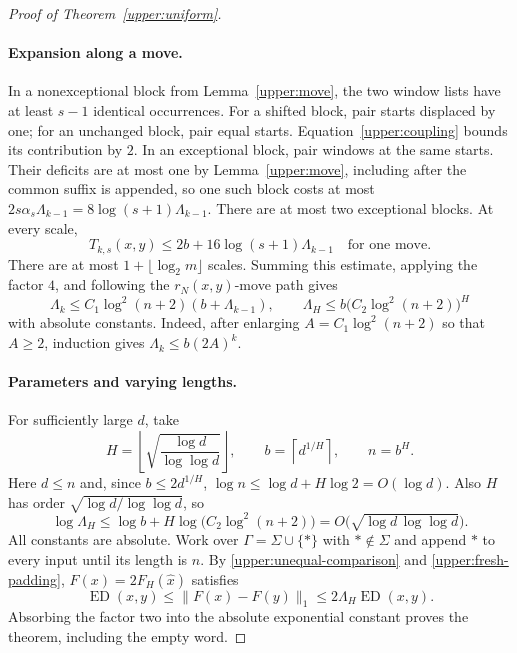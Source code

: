 \begin{proof}[Proof of Theorem~\ref{upper:uniform}]
\paragraph{Expansion along a move.}
In a nonexceptional block from Lemma~\ref{upper:move}, the two window
lists have at least $s-1$ identical occurrences.  For a shifted block,
pair starts displaced by one; for an unchanged block, pair equal starts.
Equation~\eqref{upper:coupling} bounds its contribution by $2$.
In an exceptional block, pair windows at the same starts.  Their
deficits are at most one by Lemma~\ref{upper:move}, including after the
common suffix is appended, so one such block costs at most
$2s\alpha_s\Lambda_{k-1}=8\log(s+1)\Lambda_{k-1}$.
There are at most two exceptional blocks.  At every scale,
\begin{equation}\label{upper:power-move}
 T_{k,s}(x,y)\le2b+16\log(s+1)\Lambda_{k-1}
 \quad\text{for one move.}
\end{equation}
There are at most $1+\lfloor\log_2m\rfloor$ scales.  Summing this estimate,
applying the factor $4$, and following the $r_N(x,y)$-move path gives
\begin{equation}\label{upper:power-recurrence}
 \Lambda_k\le C_1\log^2(n+2)(b+\Lambda_{k-1}),\qquad
 \Lambda_H\le b\bigl(C_2\log^2(n+2)\bigr)^H
\end{equation}
with absolute constants.  Indeed, after enlarging
$A=C_1\log^2(n+2)$ so that $A\ge2$, induction gives
$\Lambda_k\le b(2A)^k$.

\paragraph{Parameters and varying lengths.}
For sufficiently large $d$, take
\begin{equation}\label{upper:parameters}
 H=\left\lfloor\sqrt{\frac{\log d}{\log\log d}}\right\rfloor,\qquad
 b=\left\lceil d^{1/H}\right\rceil,\qquad n=b^H.
\end{equation}
Here $d\le n$ and, since $b\le2d^{1/H}$,
$\log n\le\log d+H\log2=O(\log d)$.  Also
$H$ has order $\sqrt{\log d/\log\log d}$, so
\[
 \log\Lambda_H
 \le\log b+H\log\!\bigl(C_2\log^2(n+2)\bigr)
 =O\!\bigl(\sqrt{\log d\,\log\log d}\bigr).
\]
All constants are absolute.  Work over
$\Gamma=\Sigma\cup\{\ast\}$ with $\ast\notin\Sigma$ and append $\ast$
to every input until its length is $n$.  By
\eqref{upper:unequal-comparison} and \eqref{upper:fresh-padding},
$F(x)=2F_H(\widehat x)$ satisfies
\[
 \operatorname{ED}(x,y)\le\|F(x)-F(y)\|_1
 \le2\Lambda_H\operatorname{ED}(x,y).
\]
Absorbing the factor two into the absolute exponential constant proves
the theorem, including the empty word.
\end{proof}

